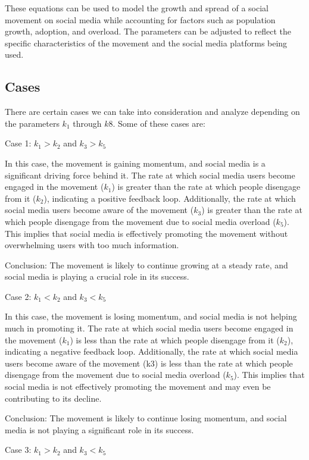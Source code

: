 \documentclass{article}
\begin{document}
	These equations can be used to model the growth and spread of a social movement on social media while accounting for factors such as population growth, adoption, and overload. The parameters can be adjusted to reflect the specific characteristics of the movement and the social media platforms being used.
 

    \subsection{Cases}

    There are certain cases we can take into consideration and analyze depending on the parameters $k_1$ through $k8$. Some of these cases are: 


    Case 1: $k_1 > k_2$ and $k_3 > k_5$


In this case, the movement is gaining momentum, and social media is a significant driving force behind it. The rate at which social media users become engaged in the movement ($k_1$) is greater than the rate at which people disengage from it ($k_2$), indicating a positive feedback loop. Additionally, the rate at which social media users become aware of the movement ($k_3$) is greater than the rate at which people disengage from the movement due to social media overload ($k_5$). This implies that social media is effectively promoting the movement without overwhelming users with too much information.

Conclusion: The movement is likely to continue growing at a steady rate, and social media is playing a crucial role in its success.

Case 2: $k_1 < k_2$ and $k_3 < k_5$


In this case, the movement is losing momentum, and social media is not helping much in promoting it. The rate at which social media users become engaged in the movement ($k_1$) is less than the rate at which people disengage from it ($k_2$), indicating a negative feedback loop. Additionally, the rate at which social media users become aware of the movement (k3) is less than the rate at which people disengage from the movement due to social media overload ($k_5$). This implies that social media is not effectively promoting the movement and may even be contributing to its decline.

Conclusion: The movement is likely to continue losing momentum, and social media is not playing a significant role in its success.

Case 3: $k_1 > k_2$ and $k_3 < k_5$
\end{document}
